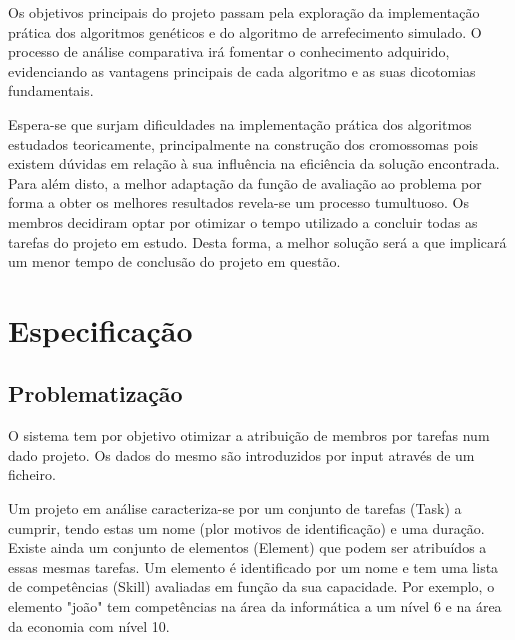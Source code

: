 \begin{titlepage}
Os objetivos principais do projeto passam pela exploração da implementação prática dos algoritmos genéticos e do algoritmo de arrefecimento simulado. O processo de análise comparativa irá fomentar o conhecimento adquirido, evidenciando as vantagens principais de cada algoritmo e as suas dicotomias fundamentais.  

Espera-se que surjam dificuldades na implementação prática dos algoritmos estudados teoricamente, principalmente na construção dos cromossomas pois existem dúvidas em relação à sua influência na eficiência da solução encontrada. Para além disto, a melhor adaptação da função de avaliação ao problema por forma a obter os melhores resultados revela-se um processo tumultuoso. Os membros decidiram optar por otimizar o tempo utilizado a concluir todas as tarefas do projeto em estudo. Desta forma, a melhor solução será a que implicará um menor tempo de conclusão do projeto em questão.


\newpage %


\section{Especificação}

\subsection{Problematização}
\justify\normalsize
O sistema tem por objetivo otimizar a atribuição de membros por tarefas num dado projeto. Os dados do mesmo são introduzidos por input através de um ficheiro.

Um projeto em análise caracteriza-se por um conjunto de tarefas (Task) a cumprir, tendo estas um nome (plor motivos de identificação) e uma duração. Existe ainda um conjunto de elementos (Element) que podem ser atribuídos a essas mesmas tarefas. Um elemento é identificado por um nome e tem uma lista de competências (Skill) avaliadas em função da sua capacidade. Por exemplo, o elemento "joão" tem competências na área da informática a um nível 6 e na área da economia com nível 10.


\end{titlepage}
